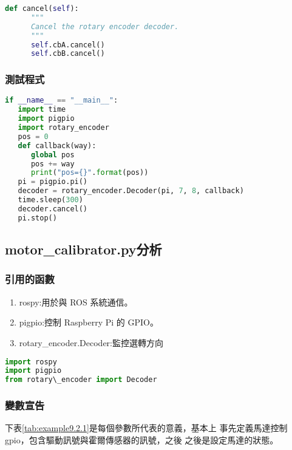 \begin{lstlisting}[language=Python, caption=取消監控]
   def cancel(self):
      """
      Cancel the rotary encoder decoder.
      """
      self.cbA.cancel()
      self.cbB.cancel()

\end{lstlisting}

\subsubsection{測試程式}
\begin{lstlisting}[language=Python, caption=測試腳本]
if __name__ == "__main__":
   import time
   import pigpio
   import rotary_encoder
   pos = 0
   def callback(way):
      global pos
      pos += way
      print("pos={}".format(pos))
   pi = pigpio.pi()
   decoder = rotary_encoder.Decoder(pi, 7, 8, callback)
   time.sleep(300)
   decoder.cancel()
   pi.stop()
\end{lstlisting}

\subsection{motor\_calibrator.py分析}
\subsubsection{引用的函數}
\begin{enumerate}
    \item rospy:用於與 ROS 系統通信。
    \item pigpio:控制 Raspberry Pi 的 GPIO。
    \item rotary\_encoder.Decoder:監控選轉方向
\end{enumerate}
\begin{lstlisting}[language=Python, caption=引用函數庫]
import rospy
import pigpio
from rotary\_encoder import Decoder
\end{lstlisting}

\subsubsection{變數宣告}
下表\ref{tab:example9.2.1}是每個參數所代表的意義，基本上
事先定義馬達控制gpio，包含驅動訊號與霍爾傳感器的訊號，之後
之後是設定馬達的狀態。

